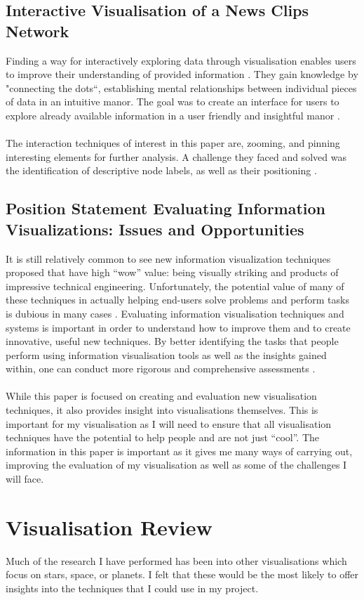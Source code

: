 \documentclass[11pt
              , a4paper
              , twoside
              , openright
              ]{report}
\begin{document}
\subsection{Interactive Visualisation of a News Clips Network }
Finding a way for interactively exploring data through visualisation enables
users to improve their understanding of provided information . They gain
knowledge by "connecting the dots``, establishing mental relationships between
individual pieces of data in an intuitive manor. The goal was to create an
interface for users to explore already available information in a user friendly
and insightful manor \cite{devezas}. 
\\\\
The interaction techniques of interest in this paper are, zooming, and pinning
interesting elements for further analysis. A challenge they faced and solved was
the identification of descriptive node labels, as well as their positioning .
\subsection{Position Statement Evaluating Information Visualizations: Issues and
Opportunities}
It is still relatively common to see new information visualization techniques
proposed that have high “wow” value: being visually striking and products of
impressive technical engineering. Unfortunately, the potential value of many of
these techniques in actually helping end-users solve problems and perform tasks
is dubious in many cases \cite{stasko}. Evaluating information visualisation
techniques and systems is important in order to understand how to improve them
and to create innovative, useful new techniques. By better identifying the tasks
that people perform using information visualisation tools as well as the
insights gained within, one can conduct more rigorous and comprehensive
assessments \cite{stasko}.
\\\\
While this paper is focused on creating and evaluation new visualisation
techniques, it also provides insight into visualisations themselves. This is
important for my visualisation as I will need to ensure that all visualisation
techniques have the potential to help people and are not just “cool”. The
information in this paper is important as it gives me many ways of carrying out,
improving the evaluation of my visualisation as well as some of the challenges I
will face.
\section{Visualisation Review}
Much of the research I have performed has been into other visualisations which
focus on stars, space, or planets. I felt that these would be the most likely to
offer insights into the techniques that I could use in my project.
\end{document}
